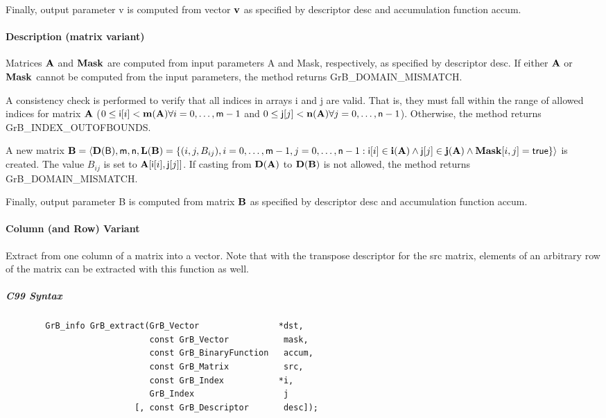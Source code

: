 Finally, output parameter {\sf v} is computed from vector ${\bf v}$ as
specified by descriptor {\sf desc} and accumulation function {\sf accum}.

\paragraph{Description (matrix variant)}

Matrices ${\bf A}$ and ${\bf Mask}$ are computed from input
parameters {\sf A} and {\sf Mask}, respectively, as specified by
descriptor {\sf desc}.  If either ${\bf A}$ or ${\bf Mask}$
cannot be computed from the input parameters, the method returns {\sf
GrB\_DOMAIN\_MISMATCH}.

A consistency check is performed to verify that all indices in arrays
{\sf i} and {\sf j} are valid. That is, they must fall within the range of allowed
indices for matrix ${\bf A}$ ($0 \leq {\sf i}[i] < \bold{m}({\bf A})
\forall i = 0,\ldots,{\sf m}-1$ and
$0 \leq {\sf j}[j] < \bold{n}({\bf A}) \forall j = 0,\ldots,{\sf n}-1$).  Otherwise, the method returns {\sf
GrB\_INDEX\_OUTOFBOUNDS}.

A new matrix ${\bf B} = \langle \bold{D}({\sf B}),{\sf m},{\sf n},
\bold{L}({\bf B}) = \{ (i,j,B_{ij}), i = 0,\ldots,{\sf m}-1, j = 0, \ldots,{\sf n}-1 : {\sf i}[i]
\in \bold{i}({\bf A}) \wedge {\sf j}[j] \in \bold{j}({\bf A}) \wedge {\bf Mask}[i,j] = {\sf true} \} \rangle$
is created.  The value $B_{ij}$ is set to ${\bf A}[{\sf i}[i],{\sf j}[j]]$. If
casting from $\bold{D}({\bf A})$ to $\bold{D}({\bf B})$ is not
allowed, the method returns {\sf GrB\_DOMAIN\_MISMATCH}.

Finally, output parameter {\sf B} is computed from matrix ${\bf B}$ as
specified by descriptor {\sf desc} and accumulation function {\sf accum}.

\paragraph{Column (and Row) Variant}

Extract from one column of a matrix into a vector.  Note that with the transpose
descriptor for the {\sf src} matrix, elements of an arbitrary row of the matrix
can be extracted with this function as well.

\subparagraph{C99 Syntax}

\begin{verbatim}
        GrB_info GrB_extract(GrB_Vector                *dst,
                             const GrB_Vector           mask,
                             const GrB_BinaryFunction   accum,
                             const GrB_Matrix           src,
                             const GrB_Index           *i,
                             GrB_Index                  j
                          [, const GrB_Descriptor       desc]); 
\end{verbatim}

